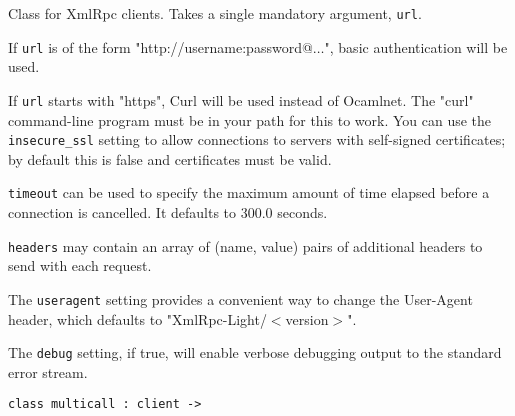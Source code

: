 \documentclass[11pt]{article}
\begin{document}
\begin{ocamldocdescription}
Class for XmlRpc clients. Takes a single mandatory argument, {\tt{url}}.


    If {\tt{url}} is of the form "http://username:password@$\ldots$", basic
    authentication will be used.


    If {\tt{url}} starts with "https", Curl will be used instead of Ocamlnet.
    The "curl" command-line program must be in your path for this to work.
    You can use the {\tt{insecure\_ssl}} setting to allow connections to servers
    with self-signed certificates; by default this is false and certificates
    must be valid.


    {\tt{timeout}} can be used to specify the maximum amount of time
    elapsed before a connection is cancelled. It defaults to 300.0 seconds.


    {\tt{headers}} may contain an array of (name, value) pairs of additional
    headers to send with each request.


    The {\tt{useragent}} setting provides a convenient way to change the
    User-Agent header, which defaults to "XmlRpc-Light/$<$version$>$".


    The {\tt{debug}} setting, if true, will enable verbose debugging output to
    the standard error stream.


\end{ocamldocdescription}




\begin{ocamldoccode}
{\tt{class multicall : }}{\tt{client -> }}\end{ocamldoccode}
\label{class:XmlRpc.multicall}
\end{document}
